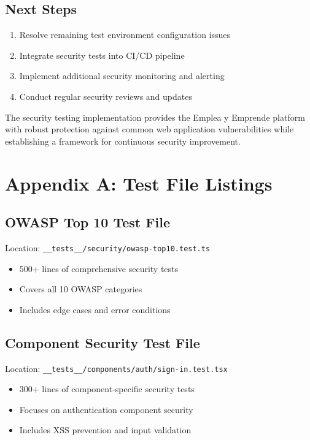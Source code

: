 \documentclass[12pt]{article}
\begin{document}
\subsection{Next Steps}
\begin{enumerate}
    \item Resolve remaining test environment configuration issues
    \item Integrate security tests into CI/CD pipeline
    \item Implement additional security monitoring and alerting
    \item Conduct regular security reviews and updates
\end{enumerate}

The security testing implementation provides the Emplea y Emprende platform with robust protection against common web application vulnerabilities while establishing a framework for continuous security improvement.

\appendix

\section{Appendix A: Test File Listings}

\subsection{OWASP Top 10 Test File}
Location: \texttt{\_\_tests\_\_/security/owasp-top10.test.ts}
\begin{itemize}
    \item 500+ lines of comprehensive security tests
    \item Covers all 10 OWASP categories
    \item Includes edge cases and error conditions
\end{itemize}

\subsection{Component Security Test File}
Location: \texttt{\_\_tests\_\_/components/auth/sign-in.test.tsx}
\begin{itemize}
    \item 300+ lines of component-specific security tests
    \item Focuses on authentication component security
    \item Includes XSS prevention and input validation
\end{itemize}
\end{document}
